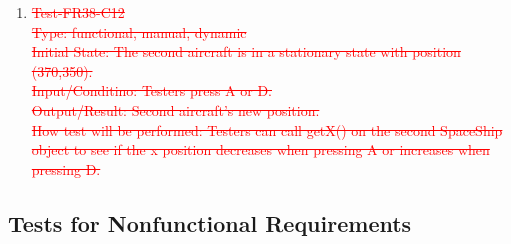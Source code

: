 \documentclass[12pt]{article}
\begin{document}
\begin{enumerate}[1.]
\item \textcolor{red}{\st{Test-FR38-C12\\
Type: functional, manual, dynamic\\
Initial State: The second aircraft is in a stationary state with position (370,350).\\
Input/Conditino: Testers press A or D.\\
Output/Result: Second aircraft's new position.\\
How test will be performed: Testers can call getX() on the second SpaceShip object to see if the x position decreases when pressing A or increases when pressing D.}}
\end{enumerate}
\subsection{Tests for Nonfunctional Requirements}
\end{document}
